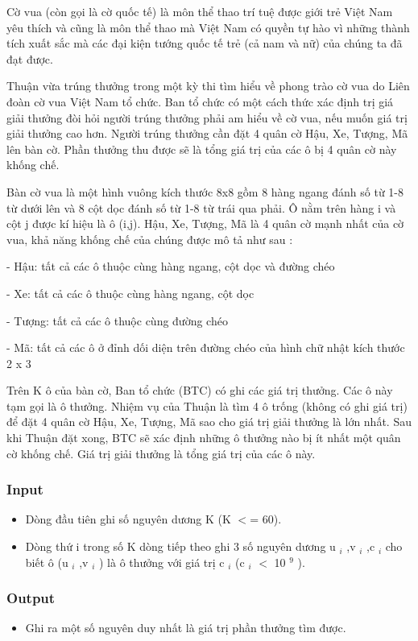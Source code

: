 

Cờ vua (còn gọi là cờ quốc tế) là môn thể thao trí tuệ được giới trẻ Việt Nam yêu thích và cũng là môn thể thao mà Việt Nam có quyền tự hào vì những thành tích xuất sắc mà các đại kiện tướng quốc tế trẻ (cả nam và nữ) của chúng ta đã đạt được.

Thuận vừa trúng thưởng trong một kỳ thi tìm hiểu về phong trào cờ vua do Liên đoàn cờ vua Việt Nam tổ chức. Ban tổ chức có một cách thức xác định trị giá giải thưởng đòi hỏi người trúng thưởng phải am hiểu về cờ vua, nếu muốn giá trị giải thưởng cao hơn. Người trúng thưởng cần đặt 4 quân cờ Hậu, Xe, Tượng, Mã lên bàn cờ. Phần thưởng thu được sẽ là tổng giá trị của các ô bị 4 quân cờ này khống chế.

Bàn cờ vua là một hình vuông kích thước 8x8 gồm 8 hàng ngang đánh số từ 1-8 từ dưới lên và 8 cột dọc đánh số từ 1-8 từ trái qua phải. Ô nằm trên hàng i và cột j được kí hiệu là ô (i,j). Hậu, Xe, Tượng, Mã là 4 quân cờ mạnh nhất của cờ vua, khả năng khống chế của chúng được mô tả như sau :

- Hậu: tất cả các ô thuộc cùng hàng ngang, cột dọc và đường chéo

- Xe: tất cả các ô thuộc cùng hàng ngang, cột dọc

- Tượng: tất cả các ô thuộc cùng đường chéo

- Mã: tất cả các ô ở đỉnh dối diện trên đường chéo của hình chữ nhật kích thước 2 x 3

Trên K ô của bàn cờ, Ban tổ chức (BTC) có ghi các giá trị thưởng. Các ô này tạm gọi là ô thưởng. Nhiệm vụ của Thuận là tìm 4 ô trống (không có ghi giá trị) để đặt 4 quân cờ Hậu, Xe, Tượng, Mã sao cho giá trị giải thưởng là lớn nhất. Sau khi Thuận đặt xong, BTC sẽ xác định những ô thưởng nào bị ít nhất một quân cờ khống chế. Giá trị giải thưởng là tổng giá trị của các ô này.

\subsubsection{Input}
\begin{itemize}
	\item Dòng đầu tiên ghi số nguyên dương K (K $<$= 60).
	\item Dòng thứ i trong số K dòng tiếp theo ghi 3 số nguyên dương u $_ i $ ,v $_ i $ ,c $_ i $ cho biết ô (u $_ i $ ,v $_ i $ ) là ô thưởng với giá trị c $_ i $ (c $_ i $ $<$ 10 $^ 9 $ ).
\end{itemize}

\subsubsection{Output}
\begin{itemize}
	\item Ghi ra một số nguyên duy nhất là giá trị phần thưởng tìm được.
\end{itemize}

